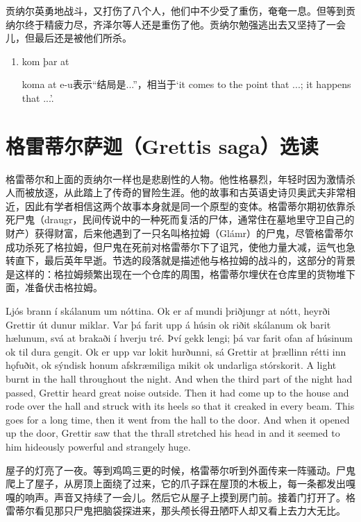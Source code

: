 \begin{translation*}{}
  贡纳尔英勇地战斗，又打伤了八个人，他们中不少受了重伤，奄奄一息。但等到贡纳尔终于精疲力尽，齐泽尔等人还是重伤了他。贡纳尔勉强逃出去又坚持了一会儿，但最后还是被他们所杀。
\end{translation*}
\begin{grammar*}{}
  \begin{enumerate}[leftmargin=*]
    \item kom þar at

          koma at e-u表示“结局是...”，相当于`it comes to the point that ...; it happens that ...'.
  \end{enumerate}
\end{grammar*}
\section{格雷蒂尔萨迦（Grettis saga）选读}
格雷蒂尔和上面的贡纳尔一样也是悲剧性的人物。他性格暴烈，年轻时因为激情杀人而被放逐，从此踏上了传奇的冒险生涯。他的故事和古英语史诗贝奥武夫非常相近，因此有学者相信这两个故事本身就是同一个原型的变体。格雷蒂尔期初依靠杀死尸鬼（draugr，民间传说中的一种死而复活的尸体，通常住在墓地里守卫自己的财产）获得财富，后来他遇到了一只名叫格拉姆（Glámr）的尸鬼，尽管格雷蒂尔成功杀死了格拉姆，但尸鬼在死前对格雷蒂尔下了诅咒，使他力量大减，运气也急转直下，最后英年早逝。节选的段落就是描述他与格拉姆的战斗的，这部分的背景是这样的：格拉姆频繁出现在一个仓库的周围，格雷蒂尔埋伏在仓库里的货物堆下面，准备伏击格拉姆。
\begin{paracol}{2}
  Ljós brann í skálanum um nóttina. Ok er af mundi þriðjungr at nótt, heyrði Grettir út dunur miklar. Var þá farit upp á húsin ok riðit skálanum ok barit hælunum, svá at brakaði í hverju tré. Því gekk lengi; þá var farit ofan af húsinum ok til dura gengit. Ok er upp var lokit hurðunni, sá Grettir at þrællinn rétti inn hǫfuðit, ok sýndisk honum afskræmiliga mikit ok undarliga stórskorit.
  \switchcolumn
  A light burnt in the hall throughout the night. And when the third part of the night had passed, Grettir heard great noise outside. Then it had come up to the house and rode over the hall and struck with its heels so that it creaked in every beam. This goes for a long time, then it went from the hall to the door. And when it opened up the door, Grettir saw that the thrall stretched his head in and it seemed to him hideously powerful and strangely huge.
\end{paracol}
\begin{translation*}{}
  屋子的灯亮了一夜。等到鸡鸣三更的时候，格雷蒂尔听到外面传来一阵骚动。尸鬼爬上了屋子，从房顶上面绕了过来，它的爪子踩在屋顶的木板上，每一条都发出嘎嘎的响声。声音又持续了一会儿。然后它从屋子上摸到房门前。接着门打开了。格雷蒂尔看见那只尸鬼把脑袋探进来，那头颅长得丑陋吓人却又看上去力大无比。
\end{translation*}
